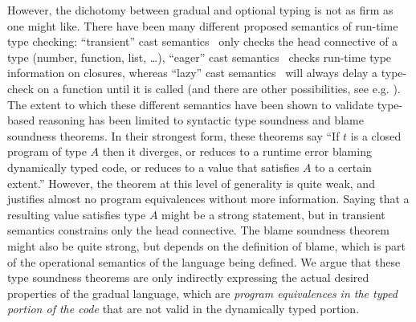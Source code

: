 \documentclass[acmsmall,screen,12pt]{acmart}
\begin{document}

However, the dichotomy between gradual and optional typing is not as
firm as one might like.
%
There have been many different proposed semantics of run-time type
checking: ``transient'' cast semantics~\citep{vitousekswordssiek:2017}
only checks the head connective of a type (number, function, list,
\ldots), ``eager'' cast semantics~\citep{herman2010spaceefficient} checks
run-time type information on closures, whereas ``lazy'' cast
semantics~\citep{findler-felleisen02} will always delay a type-check on
a function until it is called (and there are other possibilities, see
e.g.  \cite{siek+09designspace,greenberg15spaceefficient}).
%
The extent to which these different semantics have been shown to
validate type-based reasoning has been limited to syntactic type
soundness and blame soundness theorems.
%
In their strongest form, these theorems say ``If $t$ is a closed
program of type $A$ then it diverges, or reduces to a runtime error
blaming dynamically typed code, or reduces to a value that satisfies $A$ to a
certain extent.''
%
However, the theorem at this level of generality is quite weak, and
justifies almost no program equivalences without more information.
%
Saying that a resulting value satisfies type $A$ might be a strong
statement, but in transient semantics constrains only the head
connective.
%
The blame soundness theorem might also be quite strong, but depends on
the definition of blame, which is part of the operational semantics of
the language being defined.
%
We argue that these type soundness theorems are only indirectly
expressing the actual desired properties of the gradual language,
which are \emph{program equivalences in the typed portion of the code} that are
not valid in the dynamically typed portion. 
\end{document}
